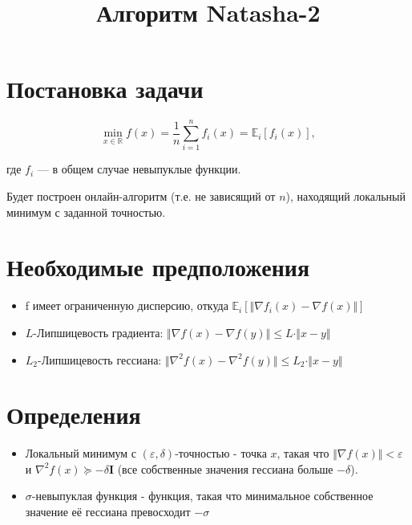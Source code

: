 \documentclass[12pt]{article}
\title{Алгоритм Natasha-2}
\begin{document}
\maketitle
 
\section{Постановка задачи}

$$ \min_{x \in \mathbb{R}} f(x) = \frac{1}{n}\sum_{i=1}^n f_i(x)  = \mathbb{E}_i [f_i(x)], $$

где ${f_i}$ --- в общем случае невыпуклые функции.

Будет построен онлайн-алгоритм (т.е. не зависящий от $n$), находящий локальный минимум с заданной точностью.

\section{Необходимые предположения}

\begin{itemize}

	\item f имеет ограниченную дисперсию, откуда $\mathbb{E}_i \left[ \Vert \nabla f_i(x) - \nabla f(x) \Vert \right]$
	\item $L$-Липшицевость градиента: $\Vert \nabla f(x) - \nabla f(y) \Vert \leq L \cdot \Vert x -y \Vert$

	\item $L_2$-Липшицевость гессиана: $\Vert \nabla^2 f(x) - \nabla^2 f(y) \Vert \leq L_2 \cdot \Vert x -y \Vert$
	
\end{itemize}


\section{Определения }

\begin{itemize}

	\item Локальный минимум с $(\varepsilon, \delta)$-точностью -  точка $x$, такая что $\Vert \nabla f(x) \Vert < \varepsilon$ и  $\nabla^2 f(x) \succeq -\delta \mathbf{I}$ (все собственные значения гессиана больше $-\delta$).

	\item $\sigma$-невыпуклая функция - функция, такая что минимальное собственное значение её гессиана превосходит $-\sigma$
\end{itemize}
\end{document}
